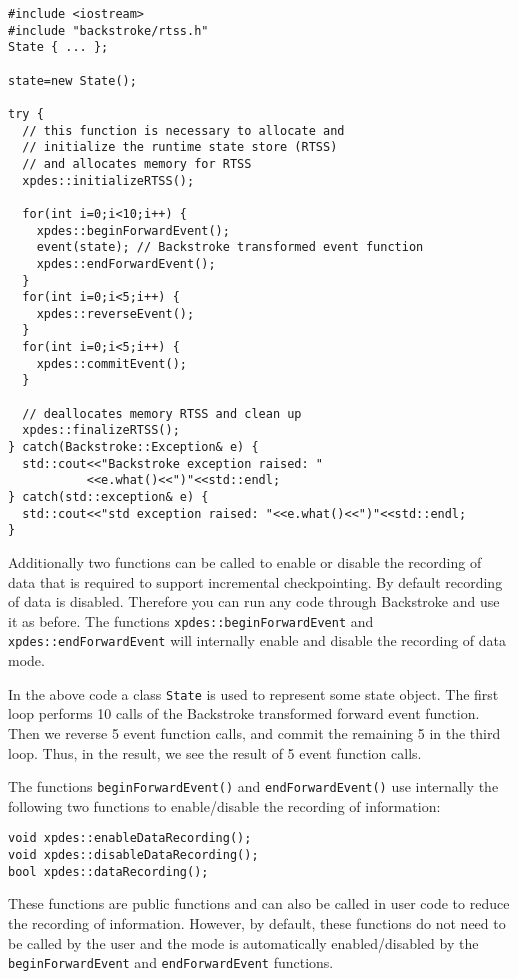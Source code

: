 \documentclass[english,12pt, titlepage]{article}      %
\begin{document}
{
\footnotesize
\begin{verbatim}
#include <iostream>
#include "backstroke/rtss.h"
State { ... };

state=new State();

try {
  // this function is necessary to allocate and
  // initialize the runtime state store (RTSS)
  // and allocates memory for RTSS
  xpdes::initializeRTSS();

  for(int i=0;i<10;i++) {
    xpdes::beginForwardEvent();
    event(state); // Backstroke transformed event function
    xpdes::endForwardEvent();
  }
  for(int i=0;i<5;i++) {
    xpdes::reverseEvent();
  }
  for(int i=0;i<5;i++) {
    xpdes::commitEvent();
  }

  // deallocates memory RTSS and clean up
  xpdes::finalizeRTSS();
} catch(Backstroke::Exception& e) {
  std::cout<<"Backstroke exception raised: "
           <<e.what()<<")"<<std::endl;
} catch(std::exception& e) {
  std::cout<<"std exception raised: "<<e.what()<<")"<<std::endl;
}
\end{verbatim}
}

Additionally two functions can be called to enable or disable the recording of data that is required to support incremental checkpointing. By default recording of data is disabled. Therefore you can run any code through Backstroke and use it as before. The functions \verb+xpdes::beginForwardEvent+ and \verb+xpdes::endForwardEvent+ will internally enable and disable the recording of data mode.

In the above code a class \verb+State+ is used to represent some state
object. The first loop performs 10
calls of the Backstroke transformed forward event function. Then we
reverse 5 event function calls, and commit the remaining 5 in the third
loop. Thus, in the result, we see the result of 5 event function
calls.

The functions \verb+beginForwardEvent()+ and \verb+endForwardEvent()+ use internally the following two functions to enable/disable the recording of information:

\begin{verbatim}
void xpdes::enableDataRecording();
void xpdes::disableDataRecording();
bool xpdes::dataRecording();
\end{verbatim}

These functions are public functions and can also be called in user code to reduce the recording of information. However, by default, these functions do not need to be called by the user and the mode is automatically enabled/disabled by the \verb+beginForwardEvent+ and \verb+endForwardEvent+ functions.
\end{document}
